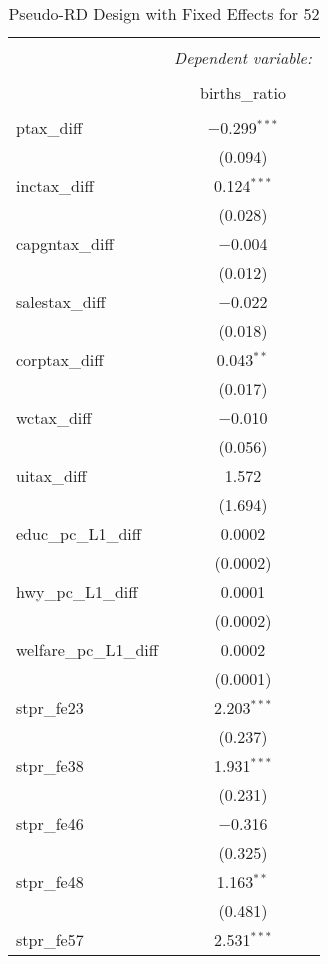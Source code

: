 
\begin{table}[!htbp] \centering 
  \caption{Pseudo-RD Design with Fixed Effects for  52} 
  \label{} 
\begin{tabular}{@{\extracolsep{5pt}}lc} 
\\[-1.8ex]\hline 
\hline \\[-1.8ex] 
 & \multicolumn{1}{c}{\textit{Dependent variable:}} \\ 
\cline{2-2} 
\\[-1.8ex] & births\_ratio \\ 
\hline \\[-1.8ex] 
 ptax\_diff & $-$0.299$^{***}$ \\ 
  & (0.094) \\ 
  inctax\_diff & 0.124$^{***}$ \\ 
  & (0.028) \\ 
  capgntax\_diff & $-$0.004 \\ 
  & (0.012) \\ 
  salestax\_diff & $-$0.022 \\ 
  & (0.018) \\ 
  corptax\_diff & 0.043$^{**}$ \\ 
  & (0.017) \\ 
  wctax\_diff & $-$0.010 \\ 
  & (0.056) \\ 
  uitax\_diff & 1.572 \\ 
  & (1.694) \\ 
  educ\_pc\_L1\_diff & 0.0002 \\ 
  & (0.0002) \\ 
  hwy\_pc\_L1\_diff & 0.0001 \\ 
  & (0.0002) \\ 
  welfare\_pc\_L1\_diff & 0.0002 \\ 
  & (0.0001) \\ 
  stpr\_fe23 & 2.203$^{***}$ \\ 
  & (0.237) \\ 
  stpr\_fe38 & 1.931$^{***}$ \\ 
  & (0.231) \\ 
  stpr\_fe46 & $-$0.316 \\ 
  & (0.325) \\ 
  stpr\_fe48 & 1.163$^{**}$ \\ 
  & (0.481) \\ 
  stpr\_fe57 & 2.531$^{***}$ \\ 

\end{tabular}
\end{table}
